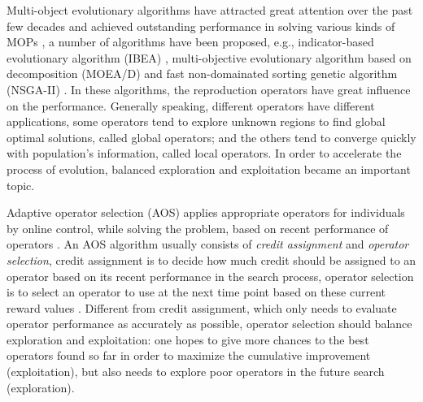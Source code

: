 \documentclass[journal]{IEEEtran}
\begin{document}
Multi-object evolutionary algorithms have attracted great attention over the past few decades and achieved outstanding performance in solving various kinds of MOPs \cite{fialho2010adaptive},
a number of algorithms have been proposed, e.g., indicator-based evolutionary algorithm (IBEA) \cite{IBEA}, multi-objective evolutionary algorithm based on decomposition (MOEA/D) \cite{moead} and fast non-domainated sorting genetic algorithm (NSGA-II) \cite{nsga2}.
In these algorithms, the reproduction operators have great influence on the performance.
Generally speaking, different operators have different applications, some operators tend to explore unknown regions to find global optimal solutions, called global operators; and the others tend to converge quickly with population's information, called local operators.
In order to accelerate the process of evolution, balanced exploration and exploitation became an important topic.

Adaptive operator selection (AOS) applies appropriate operators for individuals by online control, while solving the problem, based on recent performance of operators \cite{li2011multi}.
An AOS algorithm usually consists of \textit{credit assignment} and \textit{operator selection}, credit assignment is to decide how much credit should be assigned to an operator based on its recent performance in the search process, operator selection is to select an operator to use at the next time point based on these current reward values \cite{frrmab}.
Different from credit assignment, which only needs to evaluate operator performance as accurately as possible, operator selection should balance exploration and exploitation: one hopes to give more chances to the best operators found so far in order to maximize the cumulative improvement (exploitation), but also needs to explore poor operators in the future search (exploration).
\end{document}
